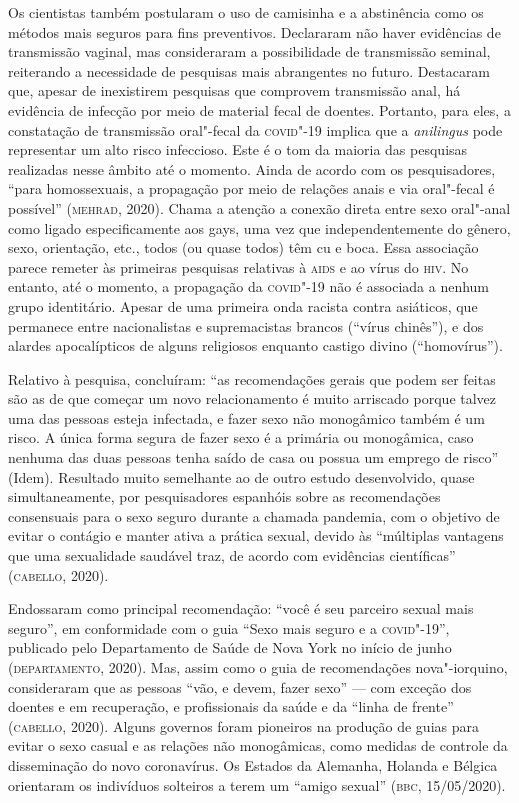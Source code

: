 Os cientistas também postularam o uso de camisinha e a abstinência como
os métodos mais seguros para fins preventivos. Declararam não haver
evidências de transmissão vaginal, mas consideraram a possibilidade de
transmissão seminal, reiterando a necessidade de pesquisas mais
abrangentes no futuro. Destacaram que, apesar de inexistirem pesquisas
que comprovem transmissão anal, há evidência de infecção por meio de
material fecal de doentes. Portanto, para eles, a constatação de
transmissão oral"-fecal da \textsc{covid}"-19 implica que a \emph{anilingus} pode
representar um alto risco infeccioso. Este é o tom da maioria das
pesquisas realizadas nesse âmbito até o momento. Ainda de acordo com os
pesquisadores, ``para homossexuais, a propagação por meio de relações
anais e via oral"-fecal é possível'' (\textsc{mehrad}, 2020). Chama a atenção a
conexão direta entre sexo oral"-anal como ligado especificamente aos
gays, uma vez que independentemente do gênero, sexo, orientação, etc.,
todos (ou quase todos) têm cu e boca. Essa associação parece remeter às
primeiras pesquisas relativas à \textsc{aids} e ao vírus do \textsc{hiv}. No entanto, até
o momento, a propagação da \textsc{covid}"-19 não é associada a nenhum grupo
identitário. Apesar de uma primeira onda racista contra asiáticos, que
permanece entre nacionalistas e supremacistas brancos (``vírus
chinês''), e dos alardes apocalípticos de alguns religiosos enquanto
castigo divino (``homovírus'').

Relativo à pesquisa, concluíram: ``as recomendações gerais que podem ser
feitas são as de que começar um novo relacionamento é muito arriscado
porque talvez uma das pessoas esteja infectada, e fazer sexo não
monogâmico também é um risco. A única forma segura de fazer sexo é a
primária ou monogâmica, caso nenhuma das duas pessoas tenha saído de
casa ou possua um emprego de risco'' (Idem). Resultado muito semelhante
ao de outro estudo desenvolvido, quase simultaneamente, por
pesquisadores espanhóis sobre as recomendações consensuais para o sexo
seguro durante a chamada pandemia, com o objetivo de evitar o contágio e
manter ativa a prática sexual, devido às ``múltiplas vantagens que uma
sexualidade saudável traz, de acordo com evidências científicas''
(\textsc{cabello}, 2020).

Endossaram como principal recomendação: ``você é seu parceiro sexual
mais seguro'', em conformidade com o guia ``Sexo mais seguro e a
\textsc{covid}"-19'', publicado pelo Departamento de Saúde de Nova York no início
de junho (\textsc{departamento}, 2020). Mas, assim como o guia de recomendações
nova"-iorquino, consideraram que as pessoas ``vão, e devem, fazer sexo''
--- com exceção dos doentes e em recuperação, e profissionais da saúde e
da ``linha de frente'' (\textsc{cabello}, 2020). Alguns governos foram pioneiros
na produção de guias para evitar o sexo casual e as relações não
monogâmicas, como medidas de controle da disseminação do novo
coronavírus. Os Estados da Alemanha, Holanda e Bélgica orientaram os
indivíduos solteiros a terem um ``amigo sexual'' (\textsc{bbc}, 15/05/2020).

